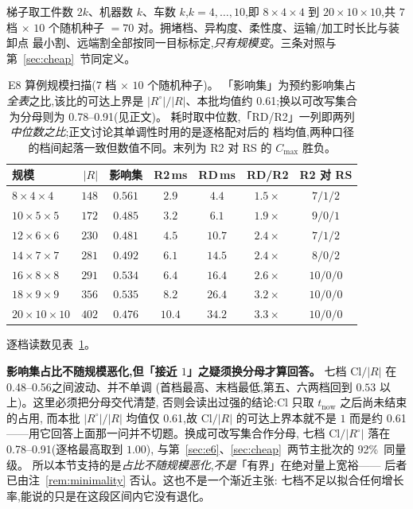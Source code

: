 \documentclass[manuscript,screen,review]{acmart}
\newcommand{\NSeeds}{10}
\newcommand{\ClosureAliveFrac}{92\%}
\newcommand{\ScaleKs}{7}
\newcommand{\ScalePairs}{70}
\newcommand{\ScaleJobsHi}{20}
\newcommand{\ScaleMachHi}{10}
\newcommand{\ScaleCloLo}{0.48}       %
\newcommand{\ScaleCloHi}{0.56}       %
\newcommand{\ScaleAliveShare}{0.61}  %
\newcommand{\ScaleCloAliveLo}{0.78}  %
\newcommand{\ScaleCloAliveHi}{0.91}  %
\begin{document}
梯子取工件数 \(2k\)、机器数 \(k\)、车数 \(k\),\(k=4,\dots,10\),即 \(8\times4\times4\) 到
\(\ScaleJobsHi\times\ScaleMachHi\times\ScaleMachHi\),共 \(\ScaleKs\) 档 \(\times\)
\(\NSeeds\) 个随机种子 \(=\ScalePairs\) 对。拥堵档、异构度、柔性度、运输/加工时长比与装卸点
最小割、远端割全部按同一目标标定,\emph{只有规模变}。三条对照与第~\ref{sec:cheap}~节同定义。

\begin{table}[t]
\centering
\caption{E8 算例规模扫描(\(\ScaleKs\) 档 \(\times\) \(\NSeeds\) 个随机种子)。
「影响集」为预约影响集占\emph{全表}之比,该比的可达上界是 \(|R^{\circ}|/|R|\)、本批均值约
\ScaleAliveShare;换以可改写集合为分母则为 \ScaleCloAliveLo--\ScaleCloAliveHi(见正文)。
耗时取中位数,「RD/R2」一列即两列\emph{中位数之比};正文讨论其单调性时用的是逐格配对后的
档均值,两种口径的档间起落一致但数值不同。末列为 R2 对 RS 的 \(C_{\max}\) 胜负。}
\label{tab:instscale}
\small
\begin{tabular}{@{}lrccccc@{}}
\toprule
规模 & \(|R|\) & 影响集 & R2\,ms & RD\,ms & RD/R2 & R2 对 RS \\
\midrule
\(8\times4\times4\)    & \(148\) & \(0.561\) & \(2.9\)  & \(4.4\)  & \(1.5\times\) & \(7/1/2\) \\
\(10\times5\times5\)   & \(172\) & \(0.485\) & \(3.2\)  & \(6.1\)  & \(1.9\times\) & \(9/0/1\) \\
\(12\times6\times6\)   & \(230\) & \(0.481\) & \(4.5\)  & \(10.7\) & \(2.4\times\) & \(7/1/2\) \\
\(14\times7\times7\)   & \(281\) & \(0.492\) & \(6.1\)  & \(14.5\) & \(2.4\times\) & \(8/0/2\) \\
\(16\times8\times8\)   & \(291\) & \(0.534\) & \(6.4\)  & \(16.4\) & \(2.6\times\) & \(10/0/0\) \\
\(18\times9\times9\)   & \(356\) & \(0.535\) & \(8.2\)  & \(26.4\) & \(3.2\times\) & \(10/0/0\) \\
\(20\times10\times10\) & \(402\) & \(0.476\) & \(10.4\) & \(34.2\) & \(3.3\times\) & \(10/0/0\) \\
\bottomrule
\end{tabular}
\end{table}

逐档读数见表~\ref{tab:instscale}。

\textbf{影响集占比不随规模恶化,但「接近 \(1\)」之疑须换分母才算回答。}
七档 \(\mathrm{Cl}/|R|\) 在 \ScaleCloLo--\ScaleCloHi 之间波动、并不单调
(首档最高、末档最低,第五、六两档回到 \(0.53\) 以上)。这里必须把分母交代清楚,
否则会读出过强的结论:\(\mathrm{Cl}\) 只取 \(t_{\mathrm{now}}\) 之后尚未结束的占用,
而本批 \(|R^{\circ}|/|R|\) 均值仅 \ScaleAliveShare,故 \(\mathrm{Cl}/|R|\) 的可达上界本就不是
\(1\) 而是约 \ScaleAliveShare——用它回答上面那一问并不切题。换成可改写集合作分母,
七档 \(\mathrm{Cl}/|R^{\circ}|\) 落在 \ScaleCloAliveLo--\ScaleCloAliveHi(逐格最高取到 \(1.00\)),
与第~\ref{sec:e6}、\ref{sec:cheap}~两节主批次的 \ClosureAliveFrac\ 同量级。
所以本节支持的是\emph{占比不随规模恶化},\emph{不是}「有界」在绝对量上宽裕——
后者已由注~\ref{rem:minimality} 否认。这也不是一个渐近主张:
七档不足以拟合任何增长率,能说的只是在这段区间内它没有退化。
\end{document}
